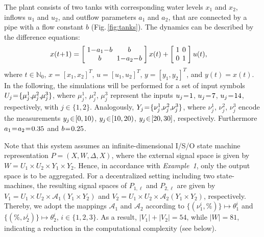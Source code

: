 \documentclass[a4paper, 10pt, conference]{ieeeconf}
\newcommand{\hspm}{\hspace{-2pt}}
\begin{document}
The plant consists of two tanks with corresponding water levels $x_1$ and $x_2$, inflows $u_1$ and $u_2$, and outflow parameters $a_1$ and $a_2$, that are connected by a pipe with a flow constant $b$ (Fig.\,\ref{fig:tanks}). The dynamics can be described by the difference equations:
\begin{align}\label{eq:twotank}
	\hspm x(t\hspm+\hspm 1)&=\left[
\begin{array}{cc}
	\hspm 1\hspm-\hspm a_1\hspm-\hspm b\hspm\hspm & b\hspm\\
	\hspm b\hspm\hspm & 1\hspm-\hspm a_2\hspm-\hspm b\hspm
\end{array}\right]x(t)+ \left[
\begin{array}{cc}
	\hspm 1\hspm &\hspm\hspm 0\hspm \\
	\hspm 0\hspm & \hspm\hspm 1\hspm
\end{array}\right]u(t), \end{align}
where $t\in\mathbb{N}_0$, $x=[x_1,x_2]^T$, $u=[u_1,u_2]^T$, $y=[y_1,y_2]^T$, and $y(t)=x(t)$. In the following, the simulations will be performed for a set of input symbols $U_j\hspm=\hspm\{\mu_{j}^1, \hspm\mu_{j}^2, \hspm\mu_{j}^3\}$, where $\mu_{j}^1$, $\mu_{j}^2$, $\mu_{j}^3$ represent the inputs $u_{j}\hspm=\hspm 1$, $u_{j}\hspm=\hspm7$, $u_j\hspm=\hspm14$, respectively, with $j\in\{1,2\}$. Analogously, $Y_j\hspm=\hspm\{\nu_{j}^1, \hspm\nu_{j}^2, \hspm\nu_{j}^3\}$, where $\nu_{j}^1$, $\nu_{j}^2$, $\nu_{j}^3$ encode the measurements $y_{j}\hspm\in\hspm [0,10)$, $y_{j}\hspm\in\hspm [10,20)$, $y_{j}\hspm\in\hspm [20,30]$, respectively. Furthermore $a_1\hspm = \hspm a_2\hspm =\hspm 0.35$ and $b\hspm =\hspm 0.25$.


Note that this system assumes an infinite-dimensional I/S/O state machine representation $P=(X,W,\Delta,X)$, where the external signal space is given by $W=U_1\times U_2\times Y_1\times Y_2$. Hence, in accordance with \emph{Example~1}, only the output space is to be aggregated. For a decentralized setting including two state-machines, the resulting signal spaces of $P_{1,\ell}$ and $P_{2,\ell}$ are given by $V_1=U_1\times U_2  \times \mathcal{A}_1(Y_1\times Y_2)$ and $V_2=U_1\times U_2 \times \mathcal{A}_2(Y_1\times Y_2)$, respectively. Thereby, we adopt the mappings $\mathcal{A}_1$ and $\mathcal{A}_2$ according to $\{(\nu_{1}^i,\%)\}\mapsto\theta_{1}^i$ and $\{(\%,\nu_{2}^i)\}\mapsto\theta_{2}^i$, $i\in\{1,2,3\}$. As a result, $|V_1|+|V_2|=54$, while $|W|=81$, indicating a reduction in the computational complexity (see below).
\end{document}

